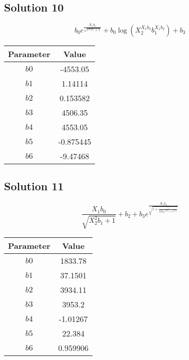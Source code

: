 \documentclass{article}
\begin{document}
\vspace{1em}
\subsection*{Solution 10}
\[
b_{0} e^{\frac{X_{1} b_{5}}{\sqrt{e^{X_{2} b_{6}} + 1}}} + b_{0} \log{\left(X_{2}^{X_{1} b_{2}} b_{1}^{X_{1} b_{2}} \right)} + b_{3}
\]
\begin{center}
\begin{tabular}{cc}
\toprule
Parameter & Value \\
\midrule
$b0$ & -4553.05 \\
$b1$ & 1.14114 \\
$b2$ & 0.153582 \\
$b3$ & 4506.35 \\
$b4$ & 4553.05 \\
$b5$ & -0.875445 \\
$b6$ & -9.47468 \\
\bottomrule
\end{tabular}
\end{center}

\vspace{1em}
\subsection*{Solution 11}
\[
\frac{X_{1} b_{0}}{\sqrt{X_{2}^{2} b_{1} + 1}} + b_{2} + b_{3} e^{\frac{X_{1} b_{4}}{\sqrt{1 + \frac{1}{X_{2}^{2} b_{5} e^{X_{1} b_{6}} + e^{X_{1} b_{6}}}}}}
\]
\begin{center}
\begin{tabular}{cc}
\toprule
Parameter & Value \\
\midrule
$b0$ & 1833.78 \\
$b1$ & 37.1501 \\
$b2$ & 3934.11 \\
$b3$ & 3953.2 \\
$b4$ & -1.01267 \\
$b5$ & 22.384 \\
$b6$ & 0.959906 \\
\bottomrule
\end{tabular}
\end{center}

\vspace{1em}
\end{document}
